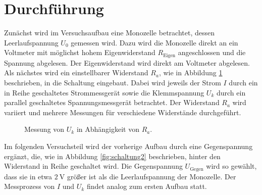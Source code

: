 \section{Durchführung}
\label{sec:Durchführung}

Zunächst wird im Versuchsaufbau eine Monozelle betrachtet, dessen Leerlaufspannung $U_0$ gemessen wird.
Dazu wird die Monozelle direkt an ein Voltmeter mit möglichst hohem Eigenwiderstand $R_{\text{Eigen}}$ angeschlossen und die Spannung abgelesen.
Der Eigenwiderstand wird direkt am Voltmeter abgelesen. \\
Als nächstes wird ein einstellbarer Widerstand $R_a$, wie in Abbildung \ref{fig:schaltung1} beschrieben, in die Schaltung eingebaut.%
Dabei wird jeweils der Strom $I$ durch ein in Reihe geschaltetes Strommessgerät sowie die Klemmspannung $U_k$ durch ein parallel geschaltetes Spannungsmessgerät betrachtet.
Der Widerstand $R_a$ wird variiert und mehrere Messungen für verschiedene Widerstände durchgeführt.

\begin{figure}[H]
  \centering
    \caption{Messung von $U_k$ in Abhängigkeit von $R_a$.}
    \label{fig:schaltung1}
\end{figure}

Im folgenden Versuchsteil wird der vorherige Aufbau durch eine Gegenspannung ergänzt, die, wie in Abbildung \ref{fig:schaltung2} beschrieben, hinter den Widerstand in Reihe geschaltet wird.
Die Gegenspannung $U_{\text{Gegen}}$ wird so gewählt, dass sie in etwa $\SI{2}{\volt}$ größer ist als die Leerlaufspannung der Monozelle.
Der Messprozess von $I$ und $U_k$ findet analog zum ersten Aufbau statt.


\tikzset{circuit declare symbol = DC source}

